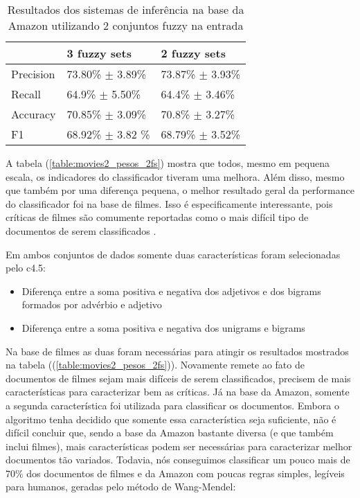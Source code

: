 \begin{table}[!h]
    \begin{tabular}{lll}
    ~         		& 3 fuzzy sets 							& 2 fuzzy sets \\ \hline
    Precision 	& 73.80\% $\pm$ 3.89\%            & 73.87\% $\pm$ 3.93\%    \\
    Recall    	& 64.9\% $\pm$ 5.50\% 				& 64.4\% $\pm$ 3.46\%   \\
    Accuracy  	& 70.85\% $\pm$ 3.09\%         	& 70.8\% $\pm$ 3.27\%    \\
    F1  				& 68.92\% $\pm$ 3.82	\%    		& 68.79\% $\pm$ 3.52\%    \\
    \end{tabular}
    \caption{Resultados dos sistemas de inferência na base da Amazon utilizando 2 conjuntos fuzzy na entrada}
	\label{table:amazon2_pesos_2fs}
\end{table}

A tabela (\ref{table:movies2_pesos_2fs}) mostra que todos, mesmo em pequena escala, os indicadores do classificador tiveram uma melhora. Além disso, mesmo que também por uma diferença pequena, o melhor resultado geral da performance do classificador foi na base de filmes. Isso é especificamente interessante, pois críticas de filmes são comumente reportadas como o mais difícil tipo de documentos de serem classificados \cite{turney2002thumbs,pang2004sentimental,chaovalit2005movie,ohana2009sentiment}. 

Em ambos conjuntos de dados somente duas características foram selecionadas pelo c4.5:
\begin{itemize}
\item Diferença entre a soma positiva e negativa dos adjetivos e dos bigrams formados por advérbio e adjetivo
\item Diferença entre a soma positiva e negativa dos unigrams e bigrams
\end{itemize}

Na base de filmes as duas foram necessárias para atingir os resultados mostrados na tabela ((\ref{table:movies2_pesos_2fs})). Novamente remete ao fato de documentos de filmes sejam mais difíceis de serem classificados, precisem de mais características para caracterizar bem as críticas. Já na base da Amazon, somente a segunda característica foi utilizada para classificar os documentos. Embora o algoritmo tenha decidido que somente essa característica seja suficiente, não é difícil concluir que, sendo a base da Amazon bastante diversa (e que também inclui filmes), mais características podem ser necessárias para caracterizar melhor documentos tão variados.
Todavia, nós conseguimos classificar um pouco mais de 70\% dos documentos de filmes e da Amazon com poucas regras simples, legíveis para humanos, geradas pelo método de Wang-Mendel:

